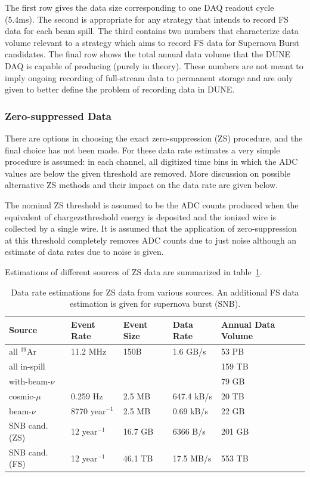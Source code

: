 The first row gives the data size corresponding to one DAQ readout cycle (5.4ms).
The second is appropriate for any strategy that intends to record FS data for each beam spill.
The third contains two numbers that characterize data volume relevant to a strategy which aims
to record FS data for Supernova Burst candidates. The final row  shows the total annual data
volume that the DUNE DAQ is capable of producing (purely in theory).
These numbers are not meant to imply ongoing recording of full-stream
data to permanent storage and are only given to better define the problem of recording data in DUNE.


\subsubsection{Zero-suppressed Data}

There are options in choosing the exact zero-suppression (ZS) procedure,
and the final choice has not been made. For these data rate estimates a very
simple procedure is assumed: in each channel, all digitized time bins in which the ADC
values are below the given threshold are removed. More discussion on possible alternative
ZS methods and their impact on the data rate are given below.

The nominal ZS threshold is assumed to be the ADC counts produced when
the equivalent of chargezsthreshold energy is deposited and the
ionized wire is collected by a single wire.
It is assumed that the application of zero-suppression at this
threshold completely removes ADC counts due to just noise although an
estimate of data rates due to noise is given.

Estimations of different sources of ZS data are summarized in table~\ref{tab:zs-volume}.

	
\begin{table}[ht!]
\centering
\begin{tabular}{| p{1.25in} | p{0.95in} | p{0.75in} | p{1in} | p{0.75in} |}		\hline		
Source & Event Rate & Event Size & Data Rate & Annual Data Volume \\ \hline
all $^{39}$Ar & 11.2 MHz & 150B & 1.6 GB/s &  53 PB \\ \hline
all in-spill & & & & 159 TB \\ \hline
with-beam-$\nu$ & & & & 79 GB \\ \hline
cosmic-$\mu$ & 0.259 Hz &2.5 MB & 647.4 kB/s & 20 TB \\	\hline
beam-$\nu$ & 8770 year$^{-1}$ & 2.5 MB & 0.69 kB/s & 22 GB \\ \hline
SNB cand. (ZS) & 12 year$^{-1}$ & 16.7 GB & 6366 B/s & 201 GB \\ \hline
SNB cand. (FS) & 12 year$^{-1}$ & 46.1 TB & 17.5 MB/s & 553 TB \\ \hline
\end{tabular}
\caption{Data rate estimations for ZS data from various sources.
An additional FS data estimation is given for supernova burst (SNB).}
\label{tab:zs-volume}
\end{table}


